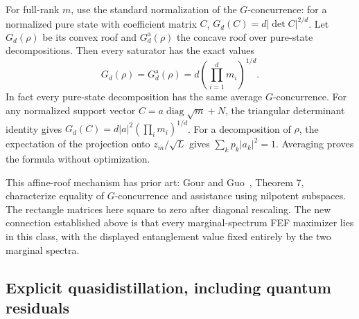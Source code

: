 For full-rank $m$, use the standard normalization of the $G$-concurrence:
for a normalized pure state with coefficient matrix $C$,
$G_d(C)=d|\det C|^{2/d}$. Let $G_d(\rho)$ be its convex roof and
$G_d^{\mathrm a}(\rho)$ the concave roof over pure-state decompositions.
Then every saturator has the exact values
\[
 G_d(\rho)=G_d^{\mathrm a}(\rho)
                   =d\left(\prod_{i=1}^d m_i\right)^{1/d}.
\]
In fact every pure-state decomposition has the same average $G$-concurrence.
For any normalized support vector $C=a\operatorname{diag}\sqrt m+N$,
the triangular determinant identity gives
$G_d(C)=d|a|^2(\prod_i m_i)^{1/d}$. For a decomposition of $\rho$,
the expectation of the projection onto $z_m/\sqrt L$ gives
$\sum_k p_k|a_k|^2=1$. Averaging proves the formula without optimization.

This affine-roof mechanism has prior art: Gour and Guo~\cite{gourguo}, Theorem 7, characterize equality of $G$-concurrence and assistance using
nilpotent subspaces. The rectangle matrices here square to zero after
diagonal rescaling. The new connection established above is that every
marginal-spectrum FEF maximizer lies in this class, with the displayed
entanglement value fixed entirely by the two marginal spectra.

\subsection{Explicit quasidistillation, including quantum residuals}

